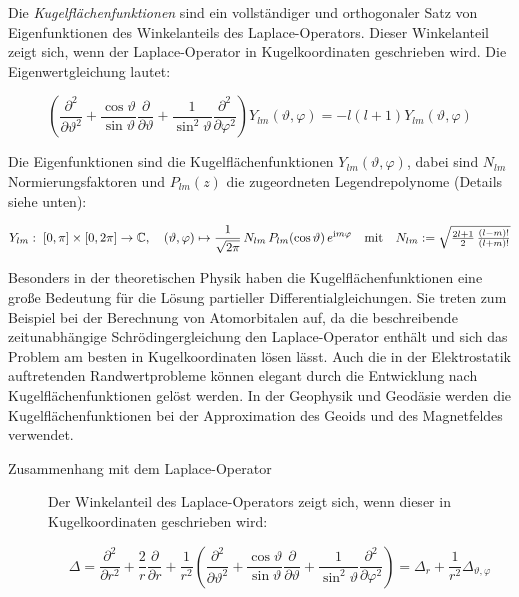 
\begin{definition}
Die \emph{Kugelflächenfunktionen} sind ein vollständiger und orthogonaler Satz von Eigenfunktionen des Winkelanteils des Laplace-Operators. Dieser Winkelanteil zeigt sich, wenn der Laplace-Operator in Kugelkoordinaten geschrieben wird. Die Eigenwertgleichung lautet:

\[\left(\frac{\partial^{2}}{\partial\vartheta^{2}}+\frac{\cos\vartheta}{\sin\vartheta}\frac{\partial}{\partial\vartheta}+\frac{1}{\sin^{2}\vartheta}\frac{\partial^{2}}{\partial\varphi^{2}}\right)Y_{lm}(\vartheta,\varphi)=-l(l+1)Y_{lm}(\vartheta,\varphi)\]

Die Eigenfunktionen sind die Kugelflächenfunktionen $Y_{lm}(\vartheta,\varphi)$, dabei sind $N_{lm}$ Normierungsfaktoren und $P_{lm}(z)$ die zugeordneten Legendrepolynome (Details siehe unten):

\[Y_{lm}:\;\left[0,\pi\right]\times\left[0,2\pi\right]\rightarrow\mathbb{C},\quad(\vartheta,\varphi)\mapsto\frac{1}{\sqrt{2\pi}}\, N_{lm}\, P_{lm}(\cos\vartheta)\, e^{\mathrm im\varphi}\\
\quad \text{mit}\quad N_{lm} := \sqrt{\tfrac{2l+1}{2}\,\tfrac{(l-m)!}{(l+m)!}}\]

Besonders in der theoretischen Physik haben die Kugelflächenfunktionen eine große Bedeutung für die Lösung partieller Differentialgleichungen. Sie treten zum Beispiel bei der Berechnung von Atomorbitalen auf, da die beschreibende zeitunabhängige Schrödingergleichung den Laplace-Operator enthält und sich das Problem am besten in Kugelkoordinaten lösen lässt. Auch die in der Elektrostatik auftretenden Randwertprobleme können elegant durch die Entwicklung nach Kugelflächenfunktionen gelöst werden. In der Geophysik und Geodäsie werden die Kugelflächenfunktionen bei der Approximation des Geoids  und des Magnetfeldes verwendet.

\begin{description}
	\item[Zusammenhang mit dem Laplace-Operator]

Der Winkelanteil des Laplace-Operators zeigt sich, wenn dieser in Kugelkoordinaten geschrieben wird:

\[\Delta=\frac{\partial^{2}}{\partial r^{2}}+\frac{2}{r}\frac{\partial}{\partial r}+\frac{1}{r^{2}}\left(\frac{\partial^{2}}{\partial\vartheta^{2}}+\frac{\cos\vartheta}{\sin\vartheta}\frac{\partial}{\partial\vartheta}+\frac{1}{\sin^{2}\vartheta}\frac{\partial^{2}}{\partial\varphi^{2}}\right)=\Delta_{r}+\frac{1}{r^{2}}\Delta_{\vartheta,\varphi}\]


\end{description}
\end{definition}
